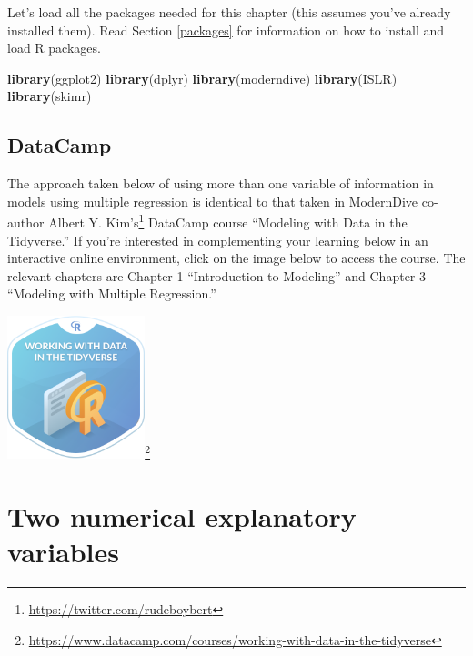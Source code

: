 \documentclass[12pt,]{krantz}
\makeatletter
\newenvironment{Shaded}{\begin{snugshade}}{\end{snugshade}}
\newcommand{\KeywordTok}[1]{\textcolor[rgb]{0.27,0.27,0.27}{\textbf{#1}}}
\newcommand{\NormalTok}[1]{#1}
\renewcommand{\href}[2]{#2\footnote{\url{#1}}}
\newenvironment{kframe}{%
\medskip{}
\setlength{\fboxsep}{.8em}
 \def\at@end@of@kframe{}%
 \ifinner\ifhmode%
  \def\at@end@of@kframe{\end{minipage}}%
  \begin{minipage}{\columnwidth}%
 \fi\fi%
 \def\FrameCommand##1{\hskip\@totalleftmargin \hskip-\fboxsep
 \colorbox{shadecolor}{##1}\hskip-\fboxsep
     \hskip-\linewidth \hskip-\@totalleftmargin \hskip\columnwidth}%
 \MakeFramed {\advance\hsize-\width
   \@totalleftmargin\z@ \linewidth\hsize
   \@setminipage}}%
 {\par\unskip\endMakeFramed%
 \at@end@of@kframe}
\renewenvironment{Shaded}{\begin{kframe}}{\end{kframe}}
\makeatother
\begin{document}
Let's load all the packages needed for this chapter (this assumes you've
already installed them). Read Section \ref{packages} for information on
how to install and load R packages.

\begin{Shaded}
\begin{Highlighting}[]
\KeywordTok{library}\NormalTok{(ggplot2)}
\KeywordTok{library}\NormalTok{(dplyr)}
\KeywordTok{library}\NormalTok{(moderndive)}
\KeywordTok{library}\NormalTok{(ISLR)}
\KeywordTok{library}\NormalTok{(skimr)}
\end{Highlighting}
\end{Shaded}

\subsection*{DataCamp}\label{datacamp-4}


The approach taken below of using more than one variable of information
in models using multiple regression is identical to that taken in
ModernDive co-author \href{https://twitter.com/rudeboybert}{Albert Y.
Kim's} DataCamp course ``Modeling with Data in the Tidyverse.'' If
you're interested in complementing your learning below in an interactive
online environment, click on the image below to access the course. The
relevant chapters are Chapter 1 ``Introduction to Modeling'' and Chapter
3 ``Modeling with Multiple Regression.''

\begin{center}
\href{https://www.datacamp.com/courses/working-with-data-in-the-tidyverse}{\includegraphics[width=0.3\textwidth]{images/datacamp_working_with_data.png}}
\end{center}

\section{Two numerical explanatory variables}\label{model3}
\end{document}
